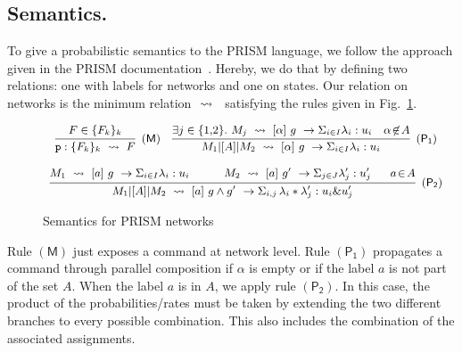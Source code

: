 \subsection{Semantics.} To give a probabilistic semantics to the PRISM
language, we follow the approach given in the PRISM
documentation~\cite{PRISMdoc}.  Hereby, we do that by defining two
relations: one with labels for networks and one on states. Our
relation on networks is the minimum relation $\ \stackrel{}{\rightsquigarrow}\ {}$
satisfying the rules given in Fig.~\ref{fig:semantics}.
% 
\begin{figure}[h]
  \begin{displaymath}\small
    \begin{array}{ccc}
      \infer[\mathsf{(M)}]
      { {\role{p}:\{F_k\}_k} \prismred{} F
      }
      {
      F\in\{F_k\}_k
      }
      \quad
      \infer[\mathsf{(P_1)}]
      {M_1\ppp A M_2\prismred{}\command {\alpha}g\lambda u
      }
      {
      \exists j\in\{1,\!2\}.\ 
      M_j\prismred{} \command {\alpha}g\lambda u
      & \alpha\!\not\in\! A
        }
      \\\\
      \infer[\mathsf{(P_2)}]
      {M_1\ppp A M_2\prismred{}
      \commandBase a{g\land g'}
      {\Sigma_{i,j}\,\lambda_i*\lambda'_j}: {u_i\& u'_j} 
      }
      {
      M_1\prismred{}\command {a}g\lambda u
      \quad&\quad 
        M_2\prismred{}\commandBase {a} {g'} \Sigma_{j\in J}\lambda'_j: u'_j
      \ &\
             a\!\in\! A}
    \end{array}
  \end{displaymath}
  \caption{Semantics for PRISM networks} 
  \label{fig:semantics}
\end{figure}
Rule $\mathsf{(M)}$ just exposes a command at network level. Rule
$\mathsf{(P_1)}$ propagates a command through parallel composition if
$\alpha$ is empty or if the label $a$ is not part of the set $A$. When
the label $a$ is in $A$, we apply rule $\mathsf{(P_2)}$. In this case,
the product of the probabilities/rates must be taken by extending the
two different branches to every possible combination. This also
includes the combination of the associated assignments.

